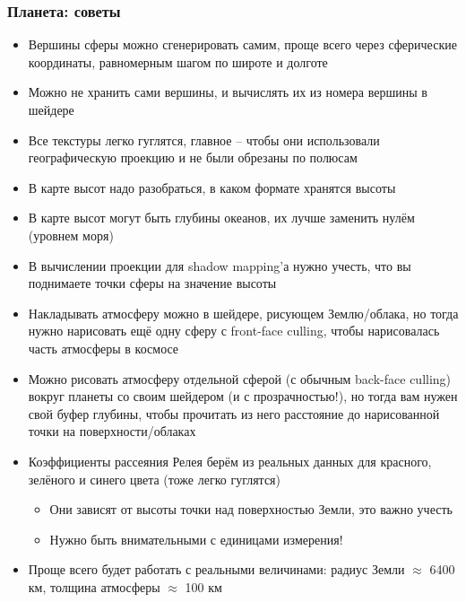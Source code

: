 \documentclass{beamer}
\begin{document}
\begin{frame}[fragile]
\frametitle{Планета: советы}
\fontsize{8pt}{8pt}
\selectfont
\begin{itemize}
\item Вершины сферы можно сгенерировать самим, проще всего через сферические координаты, равномерным шагом по широте и долготе
\item Можно не хранить сами вершины, и вычислять их из номера вершины в шейдере
\item Все текстуры легко гуглятся, главное -- чтобы они использовали географическую проекцию и не были обрезаны по полюсам
\item В карте высот надо разобраться, в каком формате хранятся высоты
\item В карте высот могут быть глубины океанов, их лучше заменить нулём (уровнем моря)
\item В вычислении проекции для shadow mapping'а нужно учесть, что вы поднимаете точки сферы на значение высоты
\item Накладывать атмосферу можно в шейдере, рисующем Землю/облака, но тогда нужно нарисовать ещё одну сферу с front-face culling, чтобы нарисовалась часть атмосферы в космосе
\item Можно рисовать атмосферу отдельной сферой (с обычным back-face culling) вокруг планеты со своим шейдером (и с прозрачностью!), но тогда вам нужен свой буфер глубины, чтобы прочитать из него расстояние до нарисованной точки на поверхности/облаках
\item Коэффициенты рассеяния Релея берём из реальных данных для красного, зелёного и синего цвета (тоже легко гуглятся)
\begin{itemize}
\fontsize{8pt}{8pt}
\selectfont
\item Они зависят от высоты точки над поверхностью Земли, это важно учесть
\item Нужно быть внимательными с единицами измерения!
\end{itemize}
\item Проще всего будет работать с реальными величинами: радиус Земли \begin{math}\approx\end{math} 6400 км, толщина атмосферы \begin{math}\approx\end{math} 100 км
\end{itemize}
\end{frame}
\end{document}
